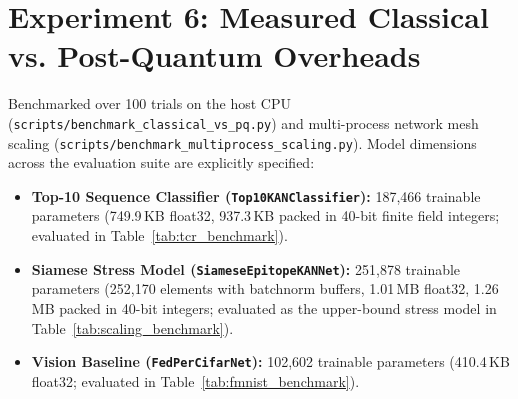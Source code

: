 \documentclass[11pt,a4paper]{report}
\begin{document}
\section{Experiment 6: Measured Classical vs. Post-Quantum Overheads}
Benchmarked over 100 trials on the host CPU (\lstinline|scripts/benchmark_classical_vs_pq.py|) and multi-process network mesh scaling (\lstinline|scripts/benchmark_multiprocess_scaling.py|). Model dimensions across the evaluation suite are explicitly specified:
\begin{itemize}[itemsep=2pt]
  \item \textbf{Top-10 Sequence Classifier (\lstinline|Top10KANClassifier|):} 187{,}466 trainable parameters (749.9\,KB float32, 937.3\,KB packed in 40-bit finite field integers; evaluated in Table~\ref{tab:tcr_benchmark}).
  \item \textbf{Siamese Stress Model (\lstinline|SiameseEpitopeKANNet|):} 251{,}878 trainable parameters (252{,}170 elements with batchnorm buffers, 1.01\,MB float32, 1.26\,MB packed in 40-bit integers; evaluated as the upper-bound stress model in Table~\ref{tab:scaling_benchmark}).
  \item \textbf{Vision Baseline (\lstinline|FedPerCifarNet|):} 102{,}602 trainable parameters (410.4\,KB float32; evaluated in Table~\ref{tab:fmnist_benchmark}).
\end{itemize}
\end{document}
